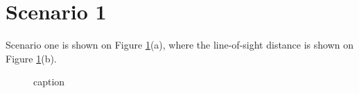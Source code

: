 \section{Scenario 1}\label{sec:scenario1}
Scenario one is shown on Figure \ref{fig:topigraphic}(a), where the line-of-sight distance is shown on Figure \ref{fig:topigraphic}(b).  
% 

\begin{figure}[H]
\hfill
{}
\hfill
{}
\hfill
\caption{caption}
\label{fig:topigraphic}
\end{figure}

